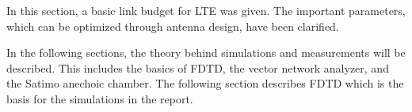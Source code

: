 \begin{aautail}
    In this section, a basic link budget for LTE was given. The important parameters, which can be optimized through antenna design, have been clarified.

    In the following sections, the theory behind simulations and measurements will be described. This includes the basics of FDTD, the vector network analyzer, and the Satimo anechoic chamber. The following section describes FDTD which is the basis for the simulations in the report.
\end{aautail}
